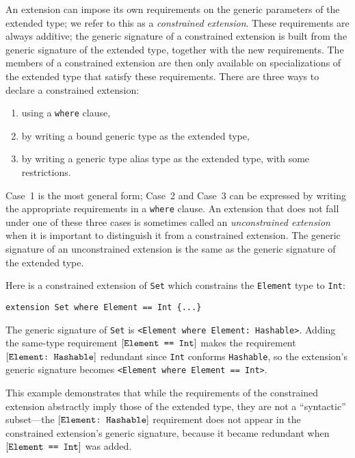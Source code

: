 \documentclass[../generics]{subfiles}
\begin{document}
An extension can impose its own requirements on the generic parameters of the extended type; we refer to this as a \emph{constrained extension}. These requirements are always additive; the generic signature of a constrained extension is built from the generic signature of the extended type, together with the new requirements. The members of a constrained extension are then only available on specializations of the extended type that satisfy these requirements. There are three ways to declare a constrained extension:
\begin{enumerate}
\item using a \texttt{where} clause,
\item by writing a bound generic type as the extended type,
\item by writing a generic type alias type as the extended type, with some restrictions.
\end{enumerate}
Case~1 is the most general form; Case~2 and Case~3 can be expressed by writing the appropriate requirements in a \texttt{where} clause. An extension that does not fall under one of these three cases is sometimes called an \emph{unconstrained extension} when it is important to distinguish it from a constrained extension. The generic signature of an unconstrained extension is the same as the generic signature of the extended type. 

Here is a constrained extension of \texttt{Set} which constrains the \texttt{Element} type to \texttt{Int}:
\begin{Verbatim}
extension Set where Element == Int {...}
\end{Verbatim}
The generic signature of \texttt{Set} is \verb|<Element where Element: Hashable>|. Adding the same-type requirement $[\texttt{Element == Int}]$ makes the requirement $[\texttt{Element:~Hashable}]$ redundant since \texttt{Int} conforms \texttt{Hashable}, so the extension's generic signature becomes \verb|<Element where Element == Int>|.

This example demonstrates that while the requirements of the constrained extension abstractly imply those of the extended type, they are not a ``syntactic'' subset---the $[\texttt{Element:~Hashable}]$ requirement does not appear in the constrained extension's generic signature, because it became redundant when $[\texttt{Element == Int}]$ was added.
\end{document}
